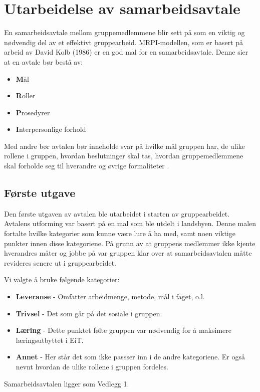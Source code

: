 \section{Utarbeidelse av samarbeidsavtale}
En samarbeidsavtale mellom gruppemedlemmene blir sett på som en viktig og nødvendig del av et effektivt gruppearbeid. 
MRPI-modellen, som er basert på arbeid av David Kolb (1986) er en god mal for en samarbeidsavtale. 
Denne sier at en avtale bør bestå av:
\begin{itemize}
  \item \textbf{M}ål
  \item \textbf{R}oller
  \item \textbf{P}rosedyrer
  \item \textbf{I}nterpersonlige forhold
\end{itemize}
Med andre bør avtalen bør inneholde svar på hvilke mål gruppen har, de ulike rollene i gruppen, hvordan beslutninger skal tas, hvordan gruppemedlemmene skal forholde seg til hverandre og øvrige formaliteter \citep{levin}.

\subsection*{Første utgave}
Den første utgaven av avtalen ble utarbeidet i starten av gruppearbeidet. 
Avtalens utforming var basert på en mal som ble utdelt i landsbyen. 
Denne malen fortalte hvilke kategorier som kunne være lure å ha med, samt noen viktige punkter innen disse kategoriene. 
På grunn av at gruppens medlemmer ikke kjente hverandres måter og jobbe på var gruppen klar over at samarbeidsavtalen måtte revideres senere ut i gruppearbeidet. 
\vspace{\secspace}

Vi valgte å bruke følgende kategorier:
\begin{itemize}
    \item \textbf{Leveranse} - Omfatter arbeidmenge, metode, mål i faget, o.l.
    \item \textbf{Trivsel} - Det som går på det sosiale i gruppen. 
    \item \textbf{Læring} - Dette punktet følte gruppen var nødvendig for å maksimere læringsutbyttet i EiT. 
    \item \textbf{Annet} - Her står det som ikke passser inn i de andre kategoriene. Er også nevnt hvordan de ulike rollene i gruppen fordeles. 
\end{itemize}
Samarbeidsavtalen ligger som Vedlegg 1. 

